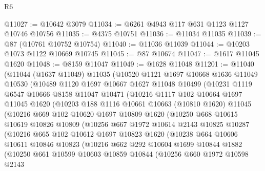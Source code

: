 \begin{lexlean}{R6}
\begin{coremodule}
@11027 := @10642 @3079
@11034 := @6261 @4943 @117 @631 @1123 @1127 @10746 @10756
@11035 := @4375 @10751
@11036 := @11034 @11035
@11039 := @87 (@10761 @10752 @10754)
@11040 := @11036 @11039
@11044 := @10203 @1073 @1122 @10669 @10745
@11045 := @87 @10674
@11047 := @1617 @11045 @1620
@11048 := @8159 @11047
@11049 := @1628 @11048
@11201 := @11040
    (@11044
      (@1637 @11049)
      @11035
      (@10520
        @1121
        @1697
        @10668
        @1636
        @11049
        @10530
        (@10489
          @1120
          @1697
          @10667
          @1627
          @11048
          @10499
          (@10231
            @1119
            @6547
            @10666
            @8158
            @11047
            @10471
            (@10216
              @1117
              @102
              @10664
              @1697
              @11045
              @1620
              (@10203
                @188
                @1116
                @10661
                @10663
                (@10810 @1620)
                @11045
                (@10216
                  @669
                  @102
                  @10620
                  @1697
                  @10809
                  @1620
                  (@10250
                    @668
                    @10615
                    @10619
                    @10826
                    @10809
                    (@10256
                      @667
                      @1972
                      @10614
                      @2143
                      @10825
                      @10287
                      (@10216
                        @665
                        @102
                        @10612
                        @1697
                        @10823
                        @1620
                        (@10238
                          @664
                          @10606
                          @10611
                          @10846
                          @10823
                          (@10216
                            @662
                            @292
                            @10604
                            @1699
                            @10844
                            @1882
                            (@10250
                              @661
                              @10599
                              @10603
                              @10859
                              @10844
                              (@10256
                                @660
                                @1972
                                @10598
                                @2143

\end{coremodule}
\end{lexlean}
